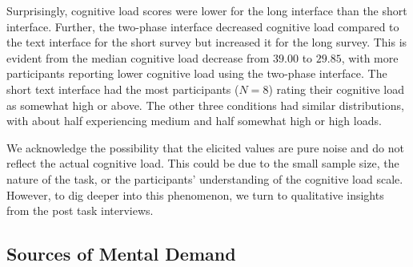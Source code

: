 
Surprisingly, cognitive load scores were lower for the long interface than the short interface. Further, the two-phase interface decreased cognitive load compared to the text interface for the short survey but increased it for the long survey. This is evident from the median cognitive load decrease from $39.00$ to $29.85$, with more participants reporting lower cognitive load using the two-phase interface. The short text interface had the most participants ($N=8$) rating their cognitive load as somewhat high or above. The other three conditions had similar distributions, with about half experiencing medium and half somewhat high or high loads.

We acknowledge the possibility that the elicited values are pure noise and do not reflect the actual cognitive load. This could be due to the small sample size, the nature of the task, or the participants' understanding of the cognitive load scale. However, to dig deeper into this phenomenon, we turn to qualitative insights from the post task interviews.

\subsection{Sources of Mental Demand}
\label{sec:mental}

